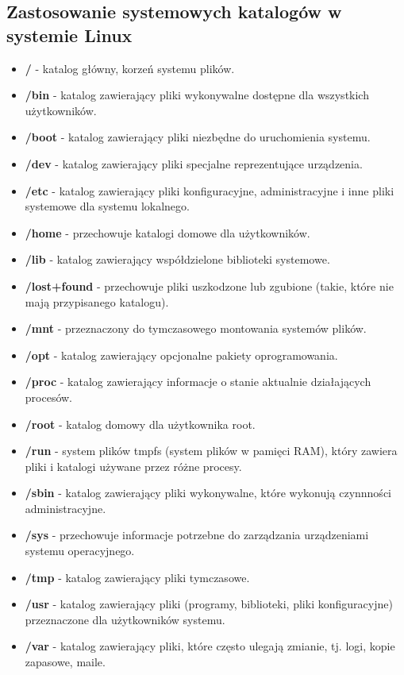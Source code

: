 \documentclass{article}
\begin{document}
\subsection{Zastosowanie systemowych katalogów w systemie Linux}
\begin{itemize}
    \item \textbf{/} - katalog główny, korzeń systemu plików.
    \item \textbf{/bin} - katalog zawierający pliki wykonywalne dostępne dla wszystkich użytkowników.
    \item \textbf{/boot} - katalog zawierający pliki niezbędne do uruchomienia systemu.
    \item \textbf{/dev} - katalog zawierający pliki specjalne reprezentujące urządzenia.
    \item \textbf{/etc} - katalog zawierający pliki konfiguracyjne, administracyjne i inne pliki systemowe dla systemu lokalnego.
    \item \textbf{/home} - przechowuje katalogi domowe dla użytkowników.
    \item \textbf{/lib} - katalog zawierający współdzielone biblioteki systemowe.
    \item \textbf{/lost+found} - przechowuje pliki uszkodzone lub zgubione (takie, które nie mają przypisanego katalogu).
    \item \textbf{/mnt} - przeznaczony do tymczasowego montowania systemów plików.
    \item \textbf{/opt} - katalog zawierający opcjonalne pakiety oprogramowania.
    \item \textbf{/proc} - katalog zawierający informacje o stanie aktualnie działających procesów.
    \item \textbf{/root} - katalog domowy dla użytkownika root.
    \item \textbf{/run} - system plików tmpfs (system plików w pamięci RAM), który zawiera pliki i katalogi używane przez różne procesy.
    \item \textbf{/sbin} - katalog zawierający pliki wykonywalne, które wykonują czynnności administracyjne.
    \item \textbf{/sys} - przechowuje informacje potrzebne do zarządzania urządzeniami systemu operacyjnego.
    \item \textbf{/tmp} - katalog zawierający pliki tymczasowe.
    \item \textbf{/usr} - katalog zawierający pliki (programy, biblioteki, pliki konfiguracyjne) przeznaczone dla użytkowników systemu.
    \item \textbf{/var} - katalog zawierający pliki, które często ulegają zmianie, tj. logi, kopie zapasowe, maile. 
\end{itemize}
\end{document}
